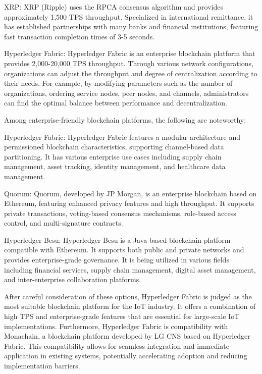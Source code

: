 \documentclass[conference]{IEEEtran}
\begin{document}
\begin{enumerate}[itemsep=2ex, parsep=1ex]
	      XRP: XRP (Ripple) uses the RPCA consensus algorithm and provides approximately 1,500 TPS throughput. Specialized in international remittance, it has established partnerships with many banks and financial institutions, featuring fast transaction completion times of 3-5 seconds.
	      	      	       
	      Hyperledger Fabric: Hyperledger Fabric is an enterprise blockchain platform that provides 2,000-20,000 TPS throughput. Through various network configurations, organizations can adjust the throughput and degree of centralization according to their needs. For example, by modifying parameters such as the number of organizations, ordering service nodes, peer nodes, and channels, administrators can find the optimal balance between performance and decentralization.
	      	      	       
	      Among enterprise-friendly blockchain platforms, the following are noteworthy:
	      	      	          
	      Hyperledger Fabric:  Hyperledger Fabric features a modular architecture and permissioned blockchain characteristics, supporting channel-based data partitioning. It has various enterprise use cases including supply chain management, asset tracking, identity management, and healthcare data management.
	      	      	           
	      Quorum: Quorum, developed by JP Morgan, is an enterprise blockchain based on Ethereum, featuring enhanced privacy features and high throughput. It supports private transactions, voting-based consensus mechanisms, role-based access control, and multi-signature contracts.
	      	      	           
	      Hyperledger  Besu: Hyperledger Besu is a Java-based blockchain platform compatible with Ethereum. It supports both public and private networks and provides enterprise-grade governance. It is being utilized in various fields including financial services, supply chain management, digital asset management, and inter-enterprise collaboration platforms.
	      	      	           
	      After careful consideration of these options, Hyperledger Fabric is judged as the most suitable blockchain platform for the IoT industry. It offers a combination of high TPS and enterprise-grade features that are essential for large-scale IoT implementations.
	      Furthermore, Hyperledger Fabric is compatibility with Monachain, a blockchain platform developed by LG CNS based on Hyperledger Fabric. This compatibility allows for seamless integration and immediate application in existing systems, potentially accelerating adoption and reducing implementation barriers.
	      	      	      

\end{enumerate}
\end{document}
